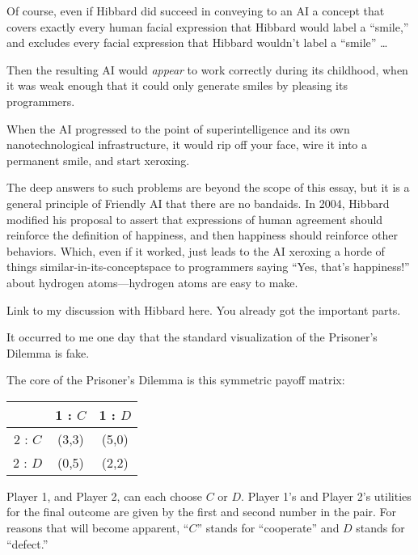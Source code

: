 {
 Of course, even if Hibbard did succeed in conveying to an AI a
concept that covers exactly every human facial expression that Hibbard
would label a ``smile,'' and
excludes every facial expression that Hibbard wouldn't
label a ``smile'' \ldots}

{
 Then the resulting AI would \textit{appear} to work correctly
during its childhood, when it was weak enough that it could only
generate smiles by pleasing its programmers.}

{
 When the AI progressed to the point of superintelligence and its
own nanotechnological infrastructure, it would rip off your face, wire
it into a permanent smile, and start xeroxing.}

{
 The deep answers to such problems are beyond the scope of this
essay, but it is a general principle of Friendly AI that there are no
bandaids. In 2004, Hibbard modified his proposal to assert that
expressions of human agreement should reinforce the definition of
happiness, and then happiness should reinforce other behaviors. Which,
even if it worked, just leads to the AI xeroxing a horde of things
similar-in-its-conceptspace to programmers saying
``Yes, that's
happiness!'' about hydrogen atoms---hydrogen atoms
are easy to make.}

{
 Link to my discussion with Hibbard here. You already got the
important parts.}

\myendsectiontext


\bigskip


{
 It occurred to me one day that the standard visualization of the
Prisoner's Dilemma is fake. }

{
 The core of the Prisoner's Dilemma is this
symmetric payoff matrix:}

\begin{center}
  \begin{tabular}{|c|c|c|}
    \hline
    &  1 : $C$ & 1 : $D$ \\
    \hline
    2 : $C$ & (3,3) & (5,0) \\
    \hline
    2 : $D$ & (0,5) & (2,2) \\
    \hline
  \end{tabular}
\end{center}

{
  Player 1, and
Player 2, can each choose $C$ or $D$. Player 1's and Player
2's utilities for the final outcome are given by the
first and second number in the pair. For reasons that will become
apparent, ``$C$'' stands for
``cooperate'' and $D$ stands for
``defect.''}

